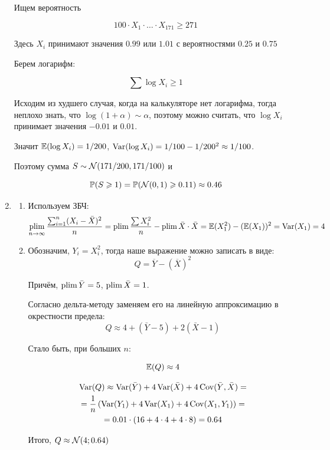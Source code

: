 \begin{enumerate}
Ищем вероятность

\[
100\cdot X_1 \cdot \ldots \cdot X_{171} \geq 271
\]

Здесь $X_i$ принимают значения $0.99$ или $1.01$ с вероятностями $0.25$ и $0.75$

Берем логарифм:

\[
\sum \log X_i \geq 1
\]

Исходим из худшего случая, когда на калькуляторе нет логарифма, тогда неплохо знать, что $\log (1+\alpha) \sim \alpha$, поэтому можно считать, что $\log X_i$ принимает значения $-0.01$ и $0.01$.

Значит $\mathbb{E}(\log X_i)=1/200$, $\operatorname{Var}(\log X_i)=1/100 - 1/200^2 \approx 1/100$.

Поэтому сумма $S \sim \mathcal{N}(171/200, 171/100)$ и

\[
\mathbb{P}(S \geqslant 1)=\mathbb{P}(\mathcal{N}(0, 1) \geqslant 0.11) \approx 0.46
\]

\item
\begin{enumerate}
\item Используем ЗБЧ:
\[
\operatorname*{plim}_{n \to \infty} \frac{\sum_{i=1}^n (X_i - \bar{X})^2}{n} = \operatorname*{plim} \frac{\sum X_i^2}{n} - \operatorname*{plim} \bar X \cdot \bar X = \mathbb{E}(X_1^2) - (\mathbb{E}(X_1))^2 = \operatorname{Var}(X_1) = 4
\]
\item Обозначим, $Y_i=X_i^2$, тогда наше выражение можно записать в виде:
\[
Q=\overline{Y} - (\overline{X})^2
\]

Причём, $\operatorname*{plim} \bar Y = 5$, $\operatorname*{plim} \bar X = 1$.

Согласно дельта-методу заменяем его на линейную аппроксимацию в окрестности предела:
\[
Q\approx 4 + (\bar Y - 5) + 2 (\bar X - 1)
\]

Стало быть, при больших $n$:

\[
\mathbb{E}(Q) \approx 4
\]

\begin{multline*}
\operatorname{Var}(Q) \approx \operatorname{Var}(\bar Y) + 4\operatorname{Var}(\bar X) + 4\operatorname{Cov}(\bar Y, \bar X) =\\
= \frac{1}{n} \left(\operatorname{Var}(Y_1) + 4 \operatorname{Var}(X_1) + 4\operatorname{Cov}(X_1, Y_1) \right) = \\
= 0.01 \cdot (16 + 4 \cdot 4 + 4 \cdot 8)= 0.64
\end{multline*}

Итого, $Q \approx \mathcal{N}(4; 0.64)$

\end{enumerate}

\end{enumerate}



